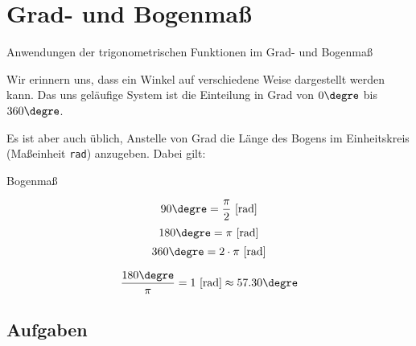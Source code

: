 
\section{Grad- und Bogenmaß}

Anwendungen der trigonometrischen Funktionen im Grad- und Bogenmaß

Wir erinnern uns, dass ein Winkel auf verschiedene Weise dargestellt
werden kann. Das uns geläufige System ist die Einteilung in Grad von
$0\degre$ bis $360\degre$.

Es ist aber auch üblich, Anstelle von Grad die Länge des Bogens im
Einheitskreis (Maßeinheit \texttt{rad}) anzugeben. Dabei gilt:

\begin{gesetz}{Bogenmaß}{}
  
  $$90\degre=\frac{\pi}2 \textrm{ [rad]}$$
  $$180\degre=\pi\textrm{ [rad]}$$
  $$360\degre=2\cdot{}\pi \textrm{ [rad]}$$

  $$\frac{180\degre}{\pi}  =1 \textrm{ [rad]} \approx{} 57.30\degre$$
  
\end{gesetz}

\subsection*{Aufgaben}


\newpage
